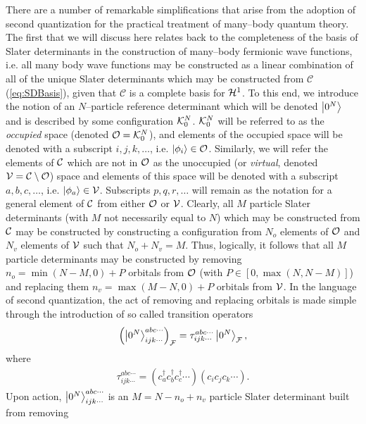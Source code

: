 There are a number of remarkable simplifications that arise from the adoption of second quantization
for the practical treatment of many--body quantum theory. The first that we will discuss here
relates back to the completeness of the basis of Slater determinants in the construction
of many--body fermionic wave functions, i.e. all many body wave functions may be constructed 
as a linear combination of all of the unique Slater determinants which may be constructed
from $\mathcal{C}$ (\cref{eq:SDBasis}), given that $\mathcal{C}$ is a complete basis for $\mathcal{H}^1$. 
To this end, we introduce the notion of an $N$--particle reference
determinant which will be denoted $\left\vert 0^N \right\rangle$ and is described by some configuration $\mathcal{K}^N_0$.
$\mathcal{K}^N_0$ will be referred to as the \emph{occupied} space (denoted $\mathcal{O} = \mathcal{K}^N_0$), 
and elements of the occupied space will be denoted with a subscript $i,j,k,\dots$,  i.e.
$\left\vert \phi_i \right\rangle \in \mathcal{O}$. Similarly, we will refer the elements of $\mathcal{C}$ which are 
not in $\mathcal{O}$ as the unoccupied (or \emph{virtual}, denoted $\mathcal{V} = \mathcal{C} \setminus \mathcal{O}$) space and elements of this space
will be denoted with a subscript $a,b,c,\ldots$, i.e. $\left\vert \phi_a \right\rangle \in \mathcal{V}$. Subscripts $p,q,r,\ldots$
will remain as the notation for a general element of $\mathcal{C}$ from either $\mathcal{O}$ or $\mathcal{V}$.
Clearly, all $M$ particle Slater determinants (with $M$ not necessarily equal to $N$) which may be constructed from $\mathcal{C}$ may be constructed 
by constructing a configuration from $N_o$ elements of $\mathcal{O}$ and $N_v$ elements of $\mathcal{V}$
such that $N_o + N_v = M$. Thus, logically, it follows that all $M$ particle determinants may be
constructed by removing $ n_o = \min{(N-M,0)} + P $ orbitals from $\mathcal{O}$ (with $P\in[0,\max{(N,N-M)}]$) and replacing them $ n_v = \max{(M-N ,0)} + P$ orbitals
from $\mathcal{V}$. In the language of second quantization, the act of removing and replacing orbitals 
is made simple through the introduction of so called transition operators
\begin{align}
\left(\left\vert 0^N \right\rangle_{ijk\cdots}^{abc\cdots}\right)_{\mathcal{F}} = \tau_{ijk\cdots}^{abc\cdots} \left\vert 0^N \right\rangle_{\mathcal{F}},
\end{align}
where
\begin{align}
  \label{eq:TauDef}
\tau_{ijk\cdots}^{abc\cdots} = \left(c_a^\dagger c_b^\dagger c_c^\dagger \cdots\right) \left( c_i c_j c_k \cdots\right).
\end{align}
Upon action, $\left\vert 0^N \right\rangle_{ijk\cdots}^{abc\cdots}$ is an $ M = N - n_o + n_v $ particle Slater determinant built from removing
